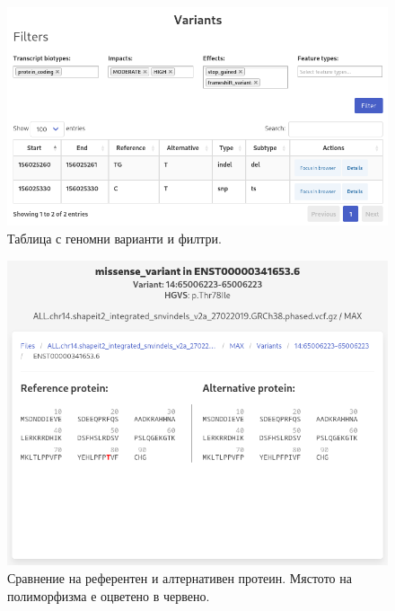 \documentclass[pdftex,cyrillic,14pt,a4page,twoside,openright]{extreport}
\begin{document}
\begin{figure}[ht]
  \centering
  \includegraphics[width=16cm]{figures/variants_list}
  \caption {Таблица с геномни варианти и филтри.}
  \label{fig:variants_list}
\end{figure}

\begin{figure}[ht]
  \centering
  \includegraphics[width=16cm]{figures/protein_comparison}
  \caption {Сравнение на референтен и алтернативен протеин. Мястото на полиморфизма е оцветено в червено.}
  \label{fig:protein_comparison}
\end{figure}
\end{document}
